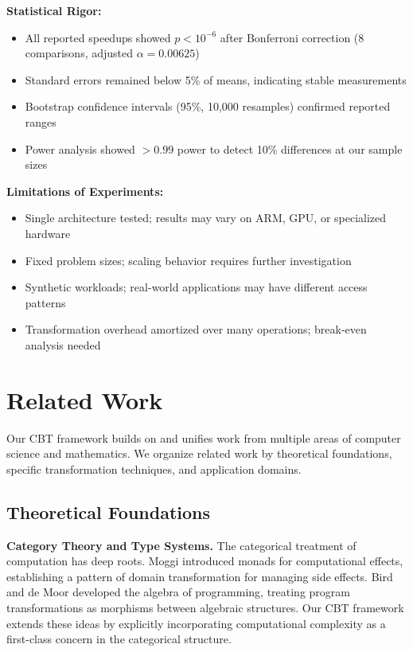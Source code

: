 \documentclass[11pt]{article}
\theoremstyle{definition}
\begin{document}
\textbf{Statistical Rigor:}
\begin{itemize}
\item All reported speedups showed $p < 10^{-6}$ after Bonferroni correction (8 comparisons, adjusted $\alpha = 0.00625$)
\item Standard errors remained below 5\% of means, indicating stable measurements
\item Bootstrap confidence intervals (95\%, 10,000 resamples) confirmed reported ranges
\item Power analysis showed $> 0.99$ power to detect 10\% differences at our sample sizes
\end{itemize}

\textbf{Limitations of Experiments:}
\begin{itemize}
\item Single architecture tested; results may vary on ARM, GPU, or specialized hardware
\item Fixed problem sizes; scaling behavior requires further investigation
\item Synthetic workloads; real-world applications may have different access patterns
\item Transformation overhead amortized over many operations; break-even analysis needed
\end{itemize}

\section{Related Work}
\label{sec:related}

Our CBT framework builds on and unifies work from multiple areas of computer science and mathematics. We organize related work by theoretical foundations, specific transformation techniques, and application domains.

\subsection{Theoretical Foundations}

\textbf{Category Theory and Type Systems.} The categorical treatment of computation has deep roots. Moggi \cite{moggi1991notions} introduced monads for computational effects, establishing a pattern of domain transformation for managing side effects. Bird and de Moor \cite{bird1997algebra} developed the algebra of programming, treating program transformations as morphisms between algebraic structures. Our CBT framework extends these ideas by explicitly incorporating computational complexity as a first-class concern in the categorical structure.
\end{document}
